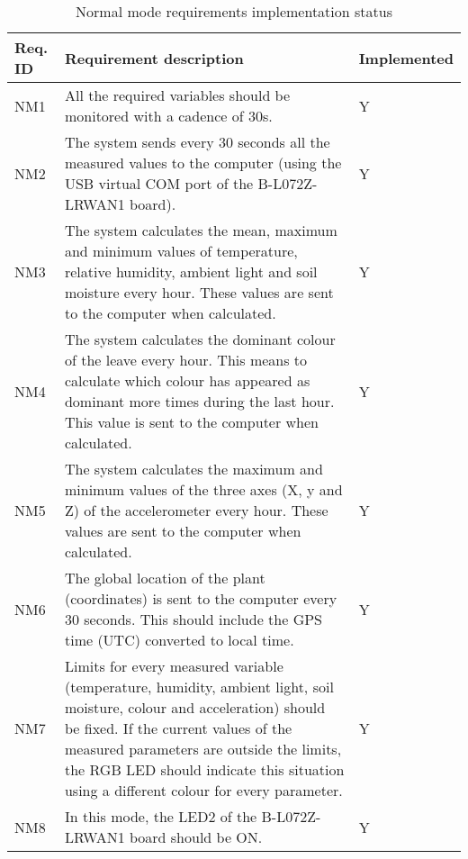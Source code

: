 \begin{table}[H]
    \begin{center}
        \begin{tabular}{|p{} | p{} | p{}|}
            \hline
            \textbf{Req. ID} & \textbf{Requirement description} & \textbf{Implemented}\\
            \hline
            NM1 & All the required variables should be monitored with a cadence of 30s. & Y\\
            \hline
            NM2 & The system sends every 30 seconds all the measured values to the computer (using the USB virtual COM port of the B-L072Z-LRWAN1 board). & Y\\
            \hline
            NM3 & The system calculates the mean, maximum and minimum values of temperature, relative humidity, ambient light and soil moisture every hour. These values are sent to the computer when calculated. & Y\\
            \hline
            NM4 & The system calculates the dominant colour of the leave every hour. This means to calculate which colour has appeared as dominant more times during the last hour. This value is sent to the computer when calculated. & Y\\
            \hline
            NM5 & The system calculates the maximum and minimum values of the three axes (X, y and Z) of the accelerometer every hour. These values are sent to the computer when calculated. & Y\\
            \hline
            NM6 & The global location of the plant (coordinates) is sent to the computer every 30 seconds. This should include the GPS time (UTC) converted to local time. & Y\\
            \hline
            NM7 & Limits for every measured variable (temperature, humidity, ambient light, soil moisture, colour and acceleration) should be fixed. If the current values of the measured parameters are outside the limits, the RGB LED should indicate this situation using a different colour for every parameter. & Y\\
            \hline
            NM8 & In this mode, the LED2 of the B-L072Z-LRWAN1 board should be ON. & Y\\
            \hline
        \end{tabular} 
    \end{center}
    \caption{Normal mode requirements implementation status}
    \label{ReqNormal}
\end{table}
